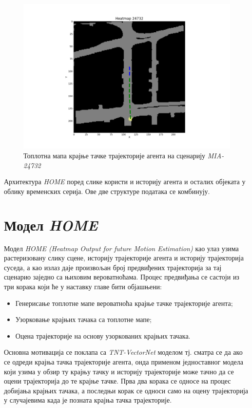 \documentclass[11pt,oneside]{memoir}
\begin{document}
\begin{figure}[H]
  \centering
  \includegraphics[width=1.0\textwidth]{images/heatmap_MIA_24732.png}
  \caption{Топлотна мапа крајње тачке трајекторије агента на сценарију \textit{MIA-24732} \label{heatmap-MIA-24732}}
\end{figure}

Архитектура \textit{HOME} поред слике користи и историју агента и осталих објеката у облику временских серија. Ове две структуре података
се комбинују.

\section{Модел \textit{HOME}}

Модел \textit{HOME (Heatmap Output for future Motion Estimation)} \cite{home} као улаз узима растеризовану слику сцене, историју трајекторије агента
и историју трајекторија суседа, 
а као излаз даје произвољан број предвиђених трајекторија за тај сценарио заједно са њиховим вероватноћама. 
Процес предвиђања се састоји из три корака који ће у наставку главе бити објашњени:
\begin{itemize}
  \item Генерисање топлотне мапе вероватноћа крајње тачке трајекторије агента;
  \item Узорковање крајњих тачака са топлотне мапе;
  \item Оцена трајекторије на основу узоркованих крајњих тачака.
\end{itemize}

Основна мотивација се поклапа са \textit{TNT-VectorNet} моделом тј. сматра се да ако се одреди крајња тачка трајекторије агента, онда применом једноставног
модела који узима у обзир ту крајњу тачку и историју трајекторије може тачно да се оцени трајекторија до те крајње тачке. Прва два корака се односе
на процес добијања крајњих тачака, а последњи корак се односи само на оцену трајекторија у случајевима када је позната крајња тачка трајекторије.
\end{document}
